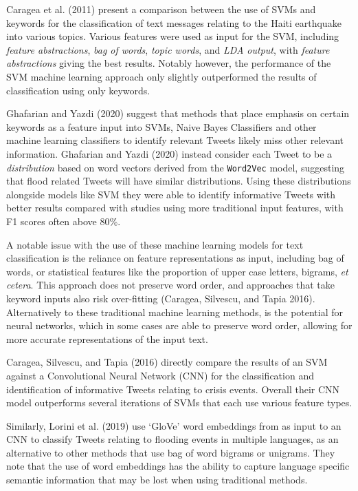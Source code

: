 \documentclass[a4paper, notitlepage]{extreport}
\begin{document}
Caragea et al. (2011) present a comparison between the use of SVMs and
keywords for the classification of text messages relating to the Haiti
earthquake into various topics. Various features were used as input for
the SVM, including \emph{feature abstractions}, \emph{bag of words},
\emph{topic words}, and \emph{LDA output}, with \emph{feature
abstractions} giving the best results. Notably however, the performance
of the SVM machine learning approach only slightly outperformed the
results of classification using only keywords.

Ghafarian and Yazdi (2020) suggest that methods that place emphasis on
certain keywords as a feature input into SVMs, Naive Bayes Classifiers
and other machine learning classifiers to identify relevant Tweets
likely miss other relevant information. Ghafarian and Yazdi (2020)
instead consider each Tweet to be a \emph{distribution} based on word
vectors derived from the \texttt{Word2Vec} model, suggesting that flood
related Tweets will have similar distributions. Using these
distributions alongside models like SVM they were able to identify
informative Tweets with better results compared with studies using more
traditional input features, with F1 scores often above 80\%.

A notable issue with the use of these machine learning models for text
classification is the reliance on feature representations as input,
including bag of words, or statistical features like the proportion of
upper case letters, bigrams, \emph{et cetera}. This approach does not
preserve word order, and approaches that take keyword inputs also risk
over-fitting (Caragea, Silvescu, and Tapia 2016). Alternatively to these
traditional machine learning methods, is the potential for neural
networks, which in some cases are able to preserve word order, allowing
for more accurate representations of the input text.

Caragea, Silvescu, and Tapia (2016) directly compare the results of an
SVM against a Convolutional Neural Network (CNN) for the classification
and identification of informative Tweets relating to crisis events.
Overall their CNN model outperforms several iterations of SVMs that each
use various feature types.

Similarly, Lorini et al. (2019) use `GloVe' word embeddings from as
input to an CNN to classify Tweets relating to flooding events in
multiple languages, as an alternative to other methods that use bag of
word bigrams or unigrams. They note that the use of word embeddings has
the ability to capture language specific semantic information that may
be lost when using traditional methods.
\end{document}
